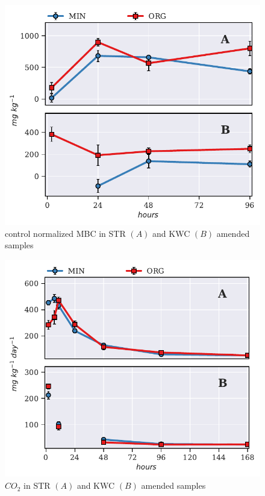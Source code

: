 \documentclass[12pt]{report}
\begin{document}
		\begin{figure}[H]
			\centering
			\includegraphics[scale=1]{thesis_figures/preliminary/control_normalized/MBC.pdf}
			\caption{control normalized MBC in STR $\left(A\right)$ and KWC $\left(B\right)$ amended   samples}
			\label{fig:nor_mbc_treated_preliminary}
		\end{figure}
		
		\begin{figure}[H]
			\centering
			\includegraphics[scale=1]{thesis_figures/preliminary/treated/Resp.pdf}
			\caption{$CO_2$ in STR $\left(A\right)$ and KWC $\left(B\right)$ amended   samples}
			\label{fig:resp_treated_preliminary}
		\end{figure}
	
\end{document}
